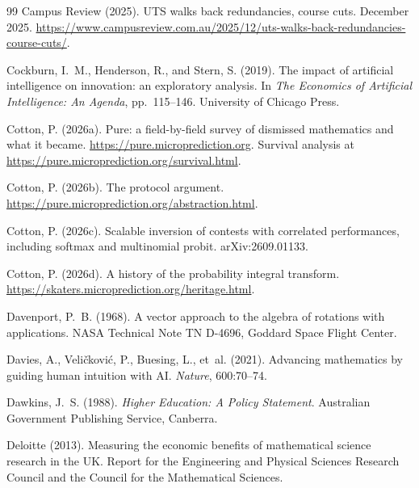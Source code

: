 \documentclass[11pt]{article}
\theoremstyle{definition}
\theoremstyle{remark}
\begin{document}
\begin{thebibliography}{99}
Campus Review (2025).
\newblock UTS walks back redundancies, course cuts.
\newblock December 2025. \url{https://www.campusreview.com.au/2025/12/uts-walks-back-redundancies-course-cuts/}.

Cockburn, I.~M., Henderson, R., and Stern, S. (2019).
\newblock The impact of artificial intelligence on innovation: an exploratory analysis.
\newblock In \emph{The Economics of Artificial Intelligence: An Agenda}, pp.\ 115--146. University of Chicago Press.

Cotton, P. (2026a).
\newblock Pure: a field-by-field survey of dismissed mathematics and what it became.
\newblock \url{https://pure.microprediction.org}. Survival analysis at \url{https://pure.microprediction.org/survival.html}.

Cotton, P. (2026b).
\newblock The protocol argument.
\newblock \url{https://pure.microprediction.org/abstraction.html}.

Cotton, P. (2026c).
\newblock Scalable inversion of contests with correlated performances, including softmax and multinomial probit.
\newblock arXiv:2609.01133.

Cotton, P. (2026d).
\newblock A history of the probability integral transform.
\newblock \url{https://skaters.microprediction.org/heritage.html}.

Davenport, P.~B. (1968).
\newblock A vector approach to the algebra of rotations with applications.
\newblock NASA Technical Note TN D-4696, Goddard Space Flight Center.

Davies, A., Veli\v{c}kovi\'c, P., Buesing, L., et~al. (2021).
\newblock Advancing mathematics by guiding human intuition with AI.
\newblock \emph{Nature}, 600:70--74.

Dawkins, J.~S. (1988).
\newblock \emph{Higher Education: A Policy Statement}.
\newblock Australian Government Publishing Service, Canberra.

Deloitte (2013).
\newblock Measuring the economic benefits of mathematical science research in the UK.
\newblock Report for the Engineering and Physical Sciences Research Council and the Council for the Mathematical Sciences.


\end{thebibliography}
\end{document}
